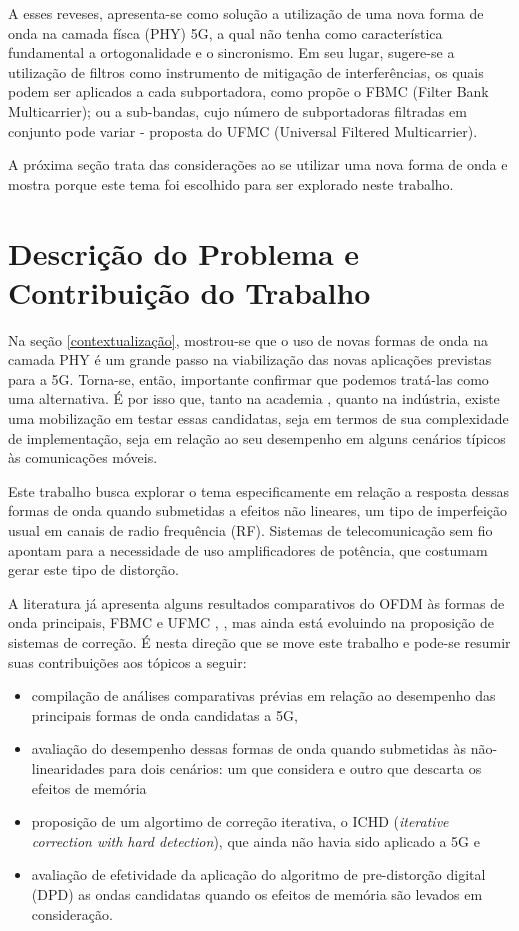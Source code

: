 \par A esses reveses, apresenta-se como solução a utilização de uma nova forma de onda na camada físca (PHY) 5G, a qual não tenha como característica fundamental a ortogonalidade e o sincronismo. Em seu lugar, sugere-se a utilização de filtros como instrumento de mitigação de interferências, os quais podem ser aplicados a cada subportadora, como propõe o FBMC (Filter Bank Multicarrier); ou a sub-bandas, cujo número de subportadoras filtradas em conjunto pode variar - proposta do UFMC (Universal Filtered Multicarrier). 
\par A próxima seção trata das considerações ao se utilizar uma nova forma de onda e mostra porque este tema foi escolhido para ser explorado neste trabalho. 

\section{Descrição do Problema e Contribuição do Trabalho}
 
Na seção \ref{contextualização}, mostrou-se que o uso de novas formas de onda na camada PHY é um grande passo na viabilização das novas aplicações previstas para a 5G. Torna-se, então, importante confirmar que podemos tratá-las como uma alternativa. É por isso que, tanto na academia \cite{Liu}, \cite{Gerzaguet} quanto na indústria, existe uma mobilização em testar essas candidatas, seja em termos de sua complexidade de implementação, seja em relação ao seu desempenho em alguns cenários típicos às comunicações móveis.  
\par Este trabalho busca explorar o tema especificamente em relação a resposta dessas formas de onda quando submetidas a efeitos não lineares, um tipo de imperfeição usual em canais de radio frequência (RF). Sistemas de telecomunicação sem fio apontam para a necessidade de uso amplificadores de potência, que costumam gerar este tipo de distorção.  
\par A literatura já apresenta alguns resultados comparativos do OFDM às formas de onda principais, FBMC e UFMC \cite{Changyoung},\cite{Maheswari} , mas ainda está evoluindo na proposição de sistemas de correção. É nesta direção que se move este trabalho e pode-se resumir suas contribuições aos tópicos a seguir:
\begin{itemize}

\item compilação de análises comparativas prévias em relação ao desempenho das principais formas de onda candidatas a 5G,
\item avaliação do desempenho dessas formas de onda quando submetidas às não-linearidades para dois cenários: um que considera e outro que descarta os efeitos de memória
\item proposição de um algortimo de correção iterativa, o ICHD (\textit{iterative correction with hard detection}), que ainda não havia sido aplicado a 5G e
\item avaliação de efetividade da aplicação do algoritmo de pre-distorção digital (DPD) as ondas candidatas quando os efeitos de memória são levados em consideração. 
 
 \end{itemize}
 
